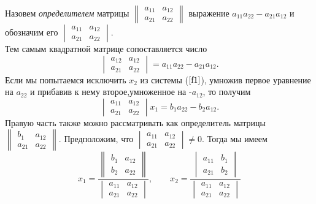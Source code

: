 {Назовем {\sl определителем} матрицы $ \begin{Vmatrix} a_{11}& a_{12}\\a_{21}& a_{22}\end{Vmatrix}$ выражение $a_{11} a_{22}-a_{21} a_{12}$ и обозначим его 
$\begin{vmatrix}a_{11}& a_{12}\\a_{21}& a_{22}\end{vmatrix}.$\\
Тем самым квадратной матрице сопоставляется число
\begin{equation}
\label{f2}
\begin{vmatrix}a_{12}&a_{12}\\ a_{21}&a_{22}\end{vmatrix}=a_{11}a_{22}-a_{21}a_{12}.
\end{equation}
Если мы попытаемся исключить $x_{2}$ из системы ($\ref{f1}$), умножив первое уравнение на $a_{22}$ и прибавив к нему второе,умноженное на -$a_{12}$, то получим 
$$\begin{vmatrix}
a_{11}&a_{12}\\
a_{21}&a_{22}
\end{vmatrix}
x_{1}
=b_{1}a_{22}-b_{2}a_{12}.
$$ 
Правую часть также можно рассматривать как определитель матрицы $\begin{Vmatrix}b_{1}&a_{12}\\ a_{21}&a_{22}\end{Vmatrix}.$ Предположим, что $\begin{vmatrix}a_{11}&a_{12}\\ a_{21}&a_{22}\end{vmatrix}\ne0.$ Тогда мы имеем 
\begin{equation}
\label{f3}
x_1= \frac{\begin{Vmatrix}b_1 & a_{12}\\ b_2 & a_{22}\end{Vmatrix}}{\begin{vmatrix} a_{11} & a_{12} \\ a_{21} & a_{22} \end{vmatrix}}, \qquad
x_2=\frac{\begin{vmatrix}a_{11} & b_{1}\\ a_{21} & b_2\end{vmatrix}}{\begin{vmatrix} a_{11} & a_{12} \\ a_{21} & a_{22} \end{vmatrix}}
\end{equation}


}
